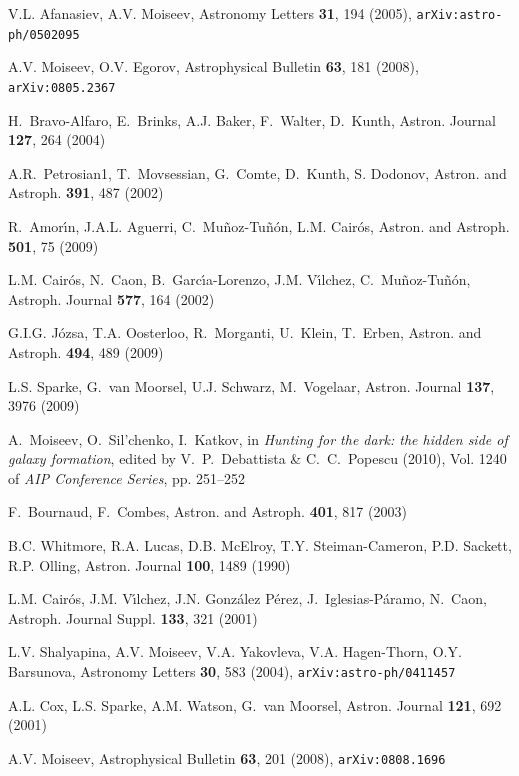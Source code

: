 \documentclass[epjCONF]{svjour}
\begin{document}
%

\begin{thebibliography}{}

V.L. {Afanasiev}, A.V. {Moiseev}, Astronomy Letters \textbf{31}, 194 (2005),
  \texttt{arXiv:astro-ph/0502095}

A.V. {Moiseev}, O.V. {Egorov}, Astrophysical Bulletin \textbf{63}, 181 (2008),
  \texttt{arXiv:0805.2367}

H.~{Bravo-Alfaro}, E.~{Brinks}, A.J. {Baker}, F.~{Walter}, D.~{Kunth}, Astron.
  Journal \textbf{127}, 264 (2004)

A.R.~Petrosian1, T.~Movsessian, G.~Comte, D.~Kunth, S. Dodonov, Astron. and Astroph. \textbf{391}, 487 (2002)

R.~{Amor{\'{\i}}n}, J.A.L. {Aguerri}, C.~{Mu{\~n}oz-Tu{\~n}{\'o}n}, L.M.
  {Cair{\'o}s}, Astron. and Astroph. \textbf{501}, 75 (2009)

L.M. {Cair{\'o}s}, N.~{Caon}, B.~{Garc{\'{\i}}a-Lorenzo}, J.M.
  {V{\'{\i}}lchez}, C.~{Mu{\~n}oz-Tu{\~n}{\'o}n}, Astroph. Journal
  \textbf{577}, 164 (2002)

G.I.G. {J{\'o}zsa}, T.A. {Oosterloo}, R.~{Morganti}, U.~{Klein}, T.~{Erben},
  Astron. and Astroph. \textbf{494}, 489 (2009)

L.S. {Sparke}, G.~{van Moorsel}, U.J. {Schwarz}, M.~{Vogelaar}, Astron. Journal
  \textbf{137}, 3976 (2009)

A.~{Moiseev}, O.~{Sil'chenko}, I.~{Katkov}, in \emph{Hunting for the dark: the hidden side of galaxy formation}, edited by {V.~P.~Debattista \& C.~C.~Popescu} (2010),  Vol. 1240 of   \emph{AIP Conference Series}, pp. 251--252

F.~{Bournaud}, F.~{Combes}, Astron. and Astroph. \textbf{401}, 817 (2003)

B.C. {Whitmore}, R.A. {Lucas}, D.B. {McElroy}, T.Y. {Steiman-Cameron}, P.D.
  {Sackett}, R.P. {Olling}, Astron. Journal \textbf{100}, 1489 (1990)

L.M. {Cair{\'o}s}, J.M. {V{\'{\i}}lchez}, J.N. {Gonz{\'a}lez P{\'e}rez},
  J.~{Iglesias-P{\'a}ramo}, N.~{Caon}, Astroph. Journal Suppl. \textbf{133},
  321 (2001)

L.V. {Shalyapina}, A.V. {Moiseev}, V.A. {Yakovleva}, V.A. {Hagen-Thorn}, O.Y.
  {Barsunova}, Astronomy Letters \textbf{30}, 583 (2004),
  \texttt{arXiv:astro-ph/0411457}

A.L. {Cox}, L.S. {Sparke}, A.M. {Watson}, G.~{van Moorsel}, Astron. Journal
  \textbf{121}, 692 (2001)

A.V. {Moiseev}, Astrophysical Bulletin \textbf{63}, 201 (2008),
  \texttt{arXiv:0808.1696}

\end{thebibliography}
\end{document}
